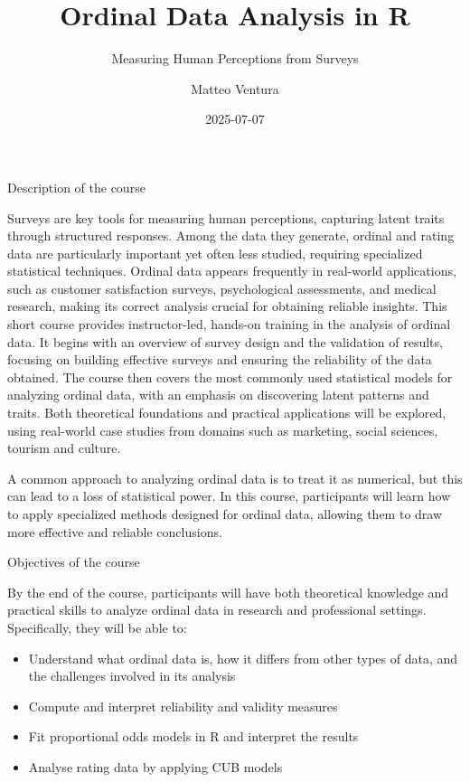 \documentclass[
  letterpaper,
  DIV=11,
  numbers=noendperiod]{scrartcl}
\title{Ordinal Data Analysis in R}
\subtitle{Measuring Human Perceptions from Surveys}
\author{Matteo Ventura}
\date{2025-07-07}
\providecommand{\tightlist}{%
  \setlength{\itemsep}{0pt}\setlength{\parskip}{0pt}}\usepackage{longtable,booktabs,array}
\begin{document}
\maketitle
\ifdefined\Shaded\renewenvironment{Shaded}{\begin{tcolorbox}[interior hidden, borderline west={3pt}{0pt}{shadecolor}, enhanced, breakable, sharp corners, boxrule=0pt, frame hidden]}{\end{tcolorbox}}\fi

Description of the course

Surveys are key tools for measuring human perceptions, capturing latent
traits through structured responses. Among the data they generate,
ordinal and rating data are particularly important yet often less
studied, requiring specialized statistical techniques. Ordinal data
appears frequently in real-world applications, such as customer
satisfaction surveys, psychological assessments, and medical research,
making its correct analysis crucial for obtaining reliable insights.
This short course provides instructor-led, hands-on training in the
analysis of ordinal data. It begins with an overview of survey design
and the validation of results, focusing on building effective surveys
and ensuring the reliability of the data obtained. The course then
covers the most commonly used statistical models for analyzing ordinal
data, with an emphasis on discovering latent patterns and traits. Both
theoretical foundations and practical applications will be explored,
using real-world case studies from domains such as marketing, social
sciences, tourism and culture.

A common approach to analyzing ordinal data is to treat it as numerical,
but this can lead to a loss of statistical power. In this course,
participants will learn how to apply specialized methods designed for
ordinal data, allowing them to draw more effective and reliable
conclusions.

Objectives of the course

By the end of the course, participants will have both theoretical
knowledge and practical skills to analyze ordinal data in research and
professional settings. Specifically, they will be able to:

\begin{itemize}
\tightlist
\item
  Understand what ordinal data is, how it differs from other types of
  data, and the challenges involved in its analysis
\item
  Compute and interpret reliability and validity measures
\item
  Fit proportional odds models in R and interpret the results
\item
  Analyse rating data by applying CUB models
\end{itemize}
\end{document}
